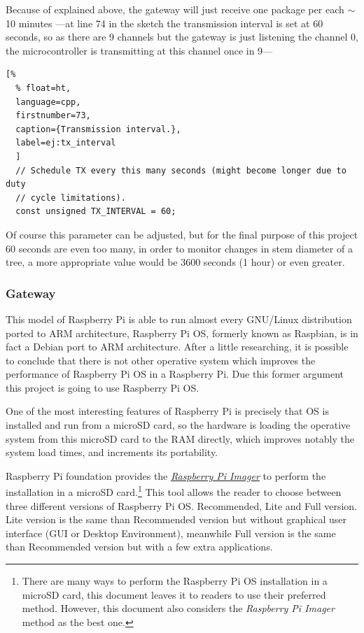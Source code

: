 \documentclass[11pt,a4paper,dvipsnames,twoside]{article}
\newcounter{subsubsubsection}[subsubsection]
\begin{document}
Because of explained above, the gateway will just receive one package per each $\sim$10 minutes ---at line 74 in the sketch the transmission interval is set at 60 seconds, so as there are 9 channels but the gateway is just listening the channel 0, the microcontroller is transmitting at this channel once in 9---

\begin{lstlisting}[%
  % float=ht,
  language=cpp,
  firstnumber=73,
  caption={Transmission interval.},
  label=ej:tx_interval
  ]
  // Schedule TX every this many seconds (might become longer due to duty
  // cycle limitations).
  const unsigned TX_INTERVAL = 60;
\end{lstlisting}

Of course this parameter can be adjusted, but for the final purpose of this project 60 seconds are even too many, in order to monitor changes in stem diameter of a tree, a more appropriate value would be 3600 seconds (1 hour) or even greater.  

\subsubsection{Gateway}

This model of Raspberry Pi is able to run almost every GNU/Linux distribution ported to ARM architecture, Raspberry Pi OS, formerly known as Raspbian, \cite{RaspberryPiOs} is in fact a Debian port to ARM architecture. After a little researching, it is possible to conclude that there is not other operative system which improves the performance of Raspberry Pi OS in a Raspberry Pi. Due this former argument this project is going to use Raspberry Pi OS.

One of the most interesting features of Raspberry Pi is precisely that OS is installed and run from a microSD card, so the hardware is loading the operative system from this microSD card to the RAM directly, which improves notably the system load times, and increments its portability.

Raspberry Pi foundation provides the \href{https://www.raspberrypi.org/downloads/noobs/}{\textit{Raspberry Pi Imager}} to perform the installation in a microSD card.\footnote{There are many ways to perform the Raspberry Pi OS installation in a microSD card, this document leaves it to readers to use their preferred method. However, this document also considers the \textit{Raspberry Pi Imager} method as the best one.} This tool allows the reader to choose between three different versions of Raspberry Pi OS. Recommended, Lite and Full version. Lite version is the same than Recommended version but without graphical user interface (GUI or Desktop Environment), meanwhile Full version is the same than Recommended version but with a few extra applications.
\end{document}
